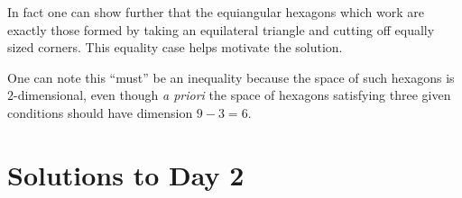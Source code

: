 \begin{remark*}
  In fact one can show further that the equiangular hexagons
  which work are exactly those formed by taking an equilateral triangle
  and cutting off equally sized corners.
  This equality case helps motivate the solution.
\end{remark*}
\begin{remark*}
  One can note this ``must'' be an inequality
  because the space of such hexagons is $2$-dimensional,
  even though \emph{a priori} the space of hexagons satisfying
  three given conditions should have dimension $9-3=6$.
\end{remark*}
\pagebreak

\section{Solutions to Day 2}
